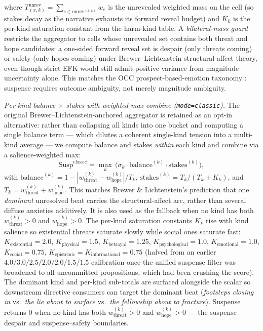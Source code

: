 \documentclass[11pt]{article}
\begin{document}
where $T^{\mathrm{unrev}}_{(x,k)}=\sum_{e\in\mathrm{unrev}^{(x,k)}}w_e$
is the unrevealed weighted mass on the cell (so stakes decay as
the narrative exhausts its forward reveal budget) and $K_k$ is
the per-kind saturation constant from the harm-kind table. A
\emph{bilateral-mass guard} restricts the aggregator to cells
whose unrevealed set contains both threat and hope candidates:
a one-sided forward reveal set is despair (only threats coming)
or safety (only hopes coming) under
Brewer--Lichtenstein structural-affect theory, even though
strict EFK would still admit positive variance from magnitude
uncertainty alone. This matches the OCC prospect-based-emotion
taxonomy \citep{ortony1988occ}: suspense requires outcome
ambiguity, not merely magnitude ambiguity.

\emph{Per-kind balance $\times$ stakes with weighted-max
combine (\texttt{mode=classic}).} The original
Brewer–Lichtenstein-anchored aggregator is retained as an
opt-in alternative: rather than collapsing all kinds into one
bucket and computing a single balance term --- which dilutes a
coherent single-kind tension into a multi-kind average --- we
compute balance and stakes \emph{within} each kind and combine
via a salience-weighted max:
\begin{equation}
\mathrm{Susp}^{\mathrm{classic}} = \max_k \,\Big( \sigma_k \cdot \mathrm{balance}^{(k)} \cdot \mathrm{stakes}^{(k)} \Big),
\end{equation}
with
$\mathrm{balance}^{(k)} = 1 - |w^{(k)}_{\mathrm{threat}} - w^{(k)}_{\mathrm{hope}}| / T_k$,
$\mathrm{stakes}^{(k)} = T_k / (T_k + K_k)$, and
$T_k = w^{(k)}_{\mathrm{threat}} + w^{(k)}_{\mathrm{hope}}$.
This matches Brewer \& Lichtenstein's prediction that one
\emph{dominant} unresolved beat carries the structural-affect
arc, rather than several diffuse anxieties additively. It is
also used as the fallback when no kind has both
$w^{(k)}_{\mathrm{threat}} > 0$ and
$w^{(k)}_{\mathrm{hope}} > 0$. The per-kind saturation
constants $K_k$ rise with kind salience so existential threats
saturate slowly while social ones saturate fast:
$K_{\mathrm{existential}}=2.0$, $K_{\mathrm{physical}}=1.5$,
$K_{\mathrm{betrayal}}=1.25$, $K_{\mathrm{psychological}}=1.0$,
$K_{\mathrm{emotional}}=1.0$, $K_{\mathrm{social}}=0.75$,
$K_{\mathrm{epistemic}}=K_{\mathrm{informational}}=0.75$ (halved from an
earlier $4.0/3.0/2.5/2.0/2.0/1.5/1.5$ calibration once the unified
suspense filter was broadened to all uncommitted propositions, which had
been crushing the score). The dominant kind and per-kind
sub-totals are surfaced alongside the scalar so downstream
directive consumers can target the dominant beat
(\emph{footsteps closing in} vs.\ \emph{the lie about to surface}
vs.\ \emph{the fellowship about to fracture}). Suspense returns
$0$ when no kind has both $w^{(k)}_{\mathrm{threat}} > 0$ and
$w^{(k)}_{\mathrm{hope}} > 0$ --- the suspense--despair and
suspense--safety boundaries.
\end{document}
